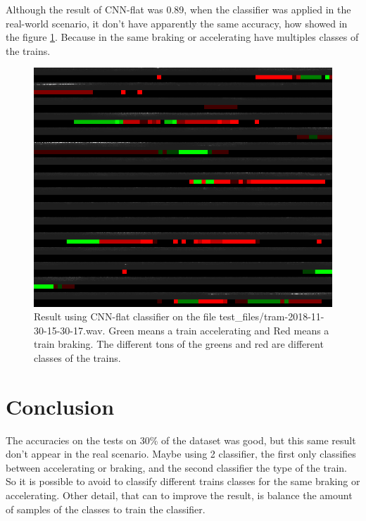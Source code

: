 \documentclass[12pt,oneside,a4paper]{article}
\begin{document}
Although the result of CNN-flat was 0.89, when the classifier was applied in the real-world scenario, it don't have apparently the same accuracy, how showed in the figure \ref{fig:result_real}. Because in the same braking or accelerating have multiples classes of the trains.

\begin{figure}[H]
	\centering
	\includegraphics[scale=0.6]{result1.png}
	\caption{ Result using CNN-flat classifier on the file test\_files/tram-2018-11-30-15-30-17.wav. Green means a train accelerating and Red means a train braking. The different tons of the greens and red are different classes of the trains. }
	\label{fig:result_real}
\end{figure}


\section{Conclusion}
	The accuracies on the tests on 30\% of the dataset was good, but this same result don't appear in the real scenario. Maybe using 2 classifier, the first only classifies between accelerating or braking, and the second classifier the type of the train. So it is possible to avoid to classify different trains classes for the same braking or accelerating. Other detail, that can to improve the result, is balance the amount of samples of the classes to train the classifier.



\end{document}
